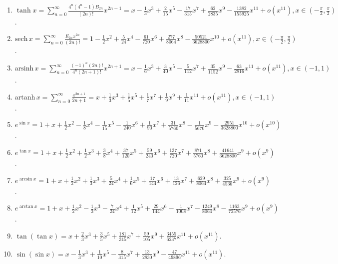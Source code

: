 \documentclass[../../main.tex]{subfiles}
\begin{document}
\begin{enumerate}
\\
\item $\tanh x=\sum_{n=0}^{\infty}\frac{4^n(4^n-1)B_{2n}}{(2n)!}x^{2n-1}=x-\frac{1}{3}x^3+\frac{2}{15}x^5-\frac{17}{315}x^7+\frac{62}{2835}x^9-\frac{1382}{155925}x^{11}+o(x^{11}),x\in\left(-\frac{\pi}{2},\frac{\pi}{2}\right)$.
\\
\item $\text{sech}\,x=\sum_{n=0}^{\infty}\frac{E_{2n}x^{2n}}{(2n)!}=1-\frac{1}{2}x^2+\frac{5}{24}x^4-\frac{61}{720}x^6+\frac{277}{8064}x^8-\frac{50521}{3628800}x^{10}+o(x^{11}),x\in\left(-\frac{\pi}{2},\frac{\pi}{2}\right)$.
\\
\item $\text{arsinh}\,x=\sum_{n=0}^{\infty}\frac{(-1)^n(2n)!}{4^n(2n+1)!}x^{2n+1}=x-\frac{1}{6}x^3+\frac{3}{40}x^5-\frac{5}{112}x^7+\frac{35}{1152}x^9-\frac{63}{2816}x^{11}+o(x^{11}),x\in(-1,1)$.
\\
\item $\text{artanh}\,x=\sum_{n=0}^{\infty}\frac{x^{2n+1}}{2n+1}=x+\frac{1}{3}x^3+\frac{1}{5}x^5+\frac{1}{7}x^7+\frac{1}{9}x^9+\frac{1}{11}x^{11}+o(x^{11}),x\in(-1,1)$.
\\
\item $e^{\sin x}=1+x+\frac{1}{2}x^2-\frac{1}{8}x^4-\frac{1}{15}x^5-\frac{1}{240}x^6+\frac{1}{90}x^7+\frac{31}{5760}x^8-\frac{1}{5670}x^9-\frac{2951}{3628800}x^{10}+o(x^{10})$.
\\
\item $e^{\tan x}=1+x+\frac{1}{2}x^2+\frac{1}{2}x^3+\frac{3}{8}x^4+\frac{37}{120}x^5+\frac{59}{240}x^6+\frac{137}{720}x^7+\frac{871}{5760}x^8+\frac{41641}{3628800}x^9+o(x^9)$.
\\
\item $e^{\arcsin x}=1+x+\frac{1}{2}x^2+\frac{1}{3}x^3+\frac{5}{24}x^4+\frac{1}{6}x^5+\frac{17}{144}x^6+\frac{13}{126}x^7+\frac{629}{8064}x^8+\frac{325}{4536}x^9+o(x^9)$.
\\
\item $e^{\arctan x}=1+x+\frac{1}{2}x^2-\frac{1}{3}x^3-\frac{7}{24}x^4+\frac{1}{12}x^5+\frac{29}{144}x^6-\frac{1}{1008}x^7-\frac{1249}{8064}x^8-\frac{1163}{72576}x^9+o(x^9)$.
\\
\item $\tan(\tan x)=x+\frac{2}{3}x^3+\frac{3}{5}x^5+\frac{181}{315}x^7+\frac{59}{105}x^9+\frac{3455}{6237}x^{11}+o(x^{11})$.
\\
\item $\sin(\sin x)=x-\frac{1}{3}x^3+\frac{1}{10}x^5-\frac{8}{315}x^7+\frac{13}{2830}x^9-\frac{47}{49896}x^{11}+o(x^{11})$.
\\

\end{enumerate}
\end{document}
